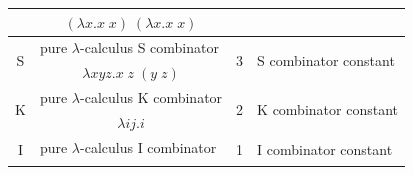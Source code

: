 \documentclass[table, a4paper, 10pt]{article}
\begin{document}
\begin{table}[H]
\begin{tabular}{cclcl}
\multicolumn{1}{|c|}{}                        & \multicolumn{2}{c|}{$(\lambda x.x\;x)\;(\lambda x.x\;x)$}                                                                                   & \multicolumn{2}{c|}{}                                                                                                                                                                                       \\ \hline
\multicolumn{1}{|c|}{\multirow{2}{*}{S}}      & \multicolumn{2}{l|}{pure $\lambda$-calculus S combinator}                                                                                   & \multicolumn{1}{c|}{\multirow{2}{*}{3}} & \multicolumn{1}{l|}{\multirow{2}{*}{S combinator constant}}                                                                                                       \\ \cline{2-3}
\multicolumn{1}{|c|}{}                        & \multicolumn{2}{c|}{$\lambda xyz.x\;z\;(y\;z)$}                                                                                             & \multicolumn{1}{c|}{}                   & \multicolumn{1}{l|}{}                                                                                                                                             \\ \hline
\multicolumn{1}{|c|}{\multirow{2}{*}{K}}      & \multicolumn{2}{l|}{pure $\lambda$-calculus K combinator}                                                                                   & \multicolumn{1}{c|}{\multirow{2}{*}{2}} & \multicolumn{1}{l|}{\multirow{2}{*}{K combinator constant}}                                                                                                       \\ \cline{2-3}
\multicolumn{1}{|c|}{}                        & \multicolumn{2}{c|}{$\lambda ij.i$}                                                                                                         & \multicolumn{1}{c|}{}                   & \multicolumn{1}{l|}{}                                                                                                                                             \\ \hline
\multicolumn{1}{|c|}{\multirow{2}{*}{I}}      & \multicolumn{2}{l|}{pure $\lambda$-calculus I combinator}                                                                                   & \multicolumn{1}{c|}{\multirow{2}{*}{1}} & \multicolumn{1}{l|}{\multirow{2}{*}{I combinator constant}}                                                                                                       \\ \cline{2-3}

\end{tabular}
\end{table}
\end{document}
